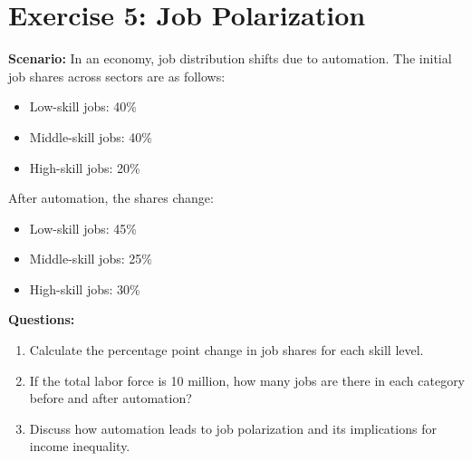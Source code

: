 \documentclass[12pt]{article}
\begin{document}
\section*{Exercise 5: Job Polarization}
\textbf{Scenario:} In an economy, job distribution shifts due to automation. The initial job shares across sectors are as follows:
\begin{itemize}
    \item Low-skill jobs: 40\%
    \item Middle-skill jobs: 40\%
    \item High-skill jobs: 20\%
\end{itemize}

After automation, the shares change:
\begin{itemize}
    \item Low-skill jobs: 45\%
    \item Middle-skill jobs: 25\%
    \item High-skill jobs: 30\%
\end{itemize}

\textbf{Questions:}
\begin{enumerate}
    \item Calculate the percentage point change in job shares for each skill level.
    \item If the total labor force is 10 million, how many jobs are there in each category before and after automation?
    \item Discuss how automation leads to job polarization and its implications for income inequality.
\end{enumerate}
\end{document}
